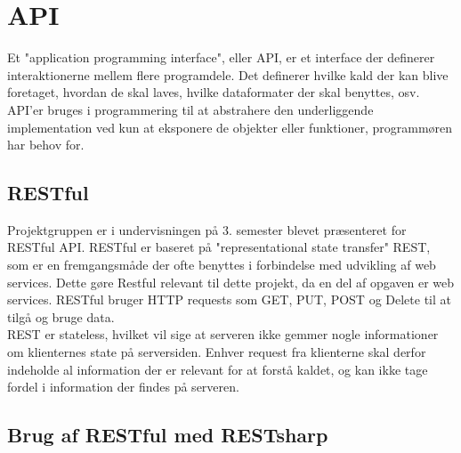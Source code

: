 \section{API}\label{sec:api}
Et "application programming interface", eller API, er et interface der definerer interaktionerne
mellem flere programdele. Det definerer hvilke kald der kan blive foretaget, hvordan de skal laves, 
hvilke dataformater der skal benyttes, osv. API'er bruges i programmering til at abstrahere den underliggende
implementation ved kun at eksponere de objekter eller funktioner, programmøren har behov for. \\

\subsection{RESTful}
Projektgruppen er i undervisningen på 3. semester blevet præsenteret for RESTful API. RESTful er
baseret på "representational state transfer" REST, som er en fremgangsmåde der ofte benyttes i forbindelse med
udvikling af web services. Dette gøre Restful relevant til dette projekt, da en del af opgaven er web services.
RESTful bruger HTTP requests som GET, PUT, POST og Delete til at tilgå og bruge data. \\

REST er stateless, hvilket vil sige at serveren ikke gemmer nogle informationer om klienternes state på serversiden.
Enhver request fra klienterne skal derfor indeholde al information der er relevant for at forstå kaldet, og kan ikke
tage fordel i information der findes på serveren. 

\subsection{Brug af RESTful med RESTsharp}
